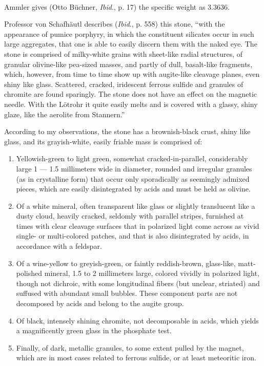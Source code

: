\documentclass[a4paper, 12pt, oneside]{article}
\begin{document}
\paragraph*{}
Ammler gives (Otto Büchner, \emph{Ibid}., p. 17) the specific weight as 3.3636.

Professor von Schafhäutl describes (\emph{Ibid}., p. 558) this stone, ``with the appearance of pumice porphyry, in which the constituent silicates occur in such large aggregates, that one is able to easily discern them with the naked eye. The stone is comprised of milky-white grains with sheet-like radial structures, of granular olivine-like pea-sized masses, and partly of dull, basalt-like fragments, which, however, from time to time show up with augite-like cleavage planes, even shiny like glass. Scattered, cracked, iridescent ferrous sulfide and granules of chromite are found sparingly. The stone does not have an effect on the magnetic needle. With the Lötrohr it quite easily melts and is covered with a glassy, shiny glaze, like the aerolite from Stannern.''

According to my observations, the stone has a brownish-black crust, shiny like glass, and its grayish-white, easily friable mass is comprised of:
\begin{enumerate}
    \item Yellowish-green to light green, somewhat cracked-in-parallel, considerably large 1 --- 1.5 millimeters wide in diameter, rounded and irregular granules (as in crystalline form) that occur only sporadically as seemingly admixed pieces, which are easily disintegrated by acids and must be held as olivine.
    \item Of a white mineral, often transparent like glass or slightly translucent like a dusty cloud, heavily cracked, seldomly with parallel stripes, furnished at times with clear cleavage surfaces that in polarized light come across as vivid single- or multi-colored patches, and that is also disintegrated by acids, in accordance with a feldspar.
    \item Of a wine-yellow to greyish-green, or faintly reddish-brown, glass-like, matt-polished mineral, 1.5 to 2 millimeters large, colored vividly in polarized light, though not dichroic, with some longitudinal fibers (but unclear, striated) and suffused with abundant small bubbles. These component parts are not decomposed by acids and belong to the augite group.
    \item Of black, intensely shining chromite, not decomposable in acids, which yields a magnificently green glass in the phosphate test.
    \item Finally, of dark, metallic granules, to some extent pulled by the magnet, which are in most cases related to ferrous sulfide, or at least meteoritic iron.
\end{enumerate}
\end{document}
